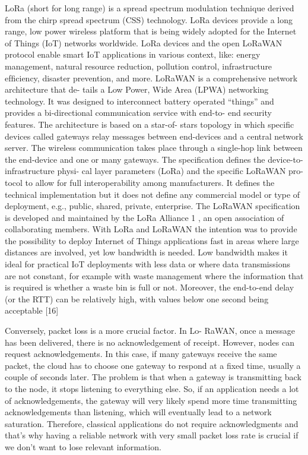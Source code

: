 	LoRa (short for long range) is a spread spectrum modulation
	technique derived from the chirp spread spectrum (CSS)
	technology. LoRa devices provide a long range, low power
	wireless platform that is being widely adopted for the Internet
	of Things (IoT) networks worldwide. LoRa devices and the
	open LoRaWAN protocol enable smart IoT applications in
	various context, like: energy management, natural resource
	reduction, pollution control, infrastructure efﬁciency, disaster
	prevention, and more.
	LoRaWAN is a comprehensive network architecture that de-
	tails a Low Power, Wide Area (LPWA) networking technology.
	It was designed to interconnect battery operated “things” and
	provides a bi-directional communication service with end-to-
	end security features. The architecture is based on a star-of-
	stars topology in which speciﬁc devices called gateways relay
	messages between end-devices and a central network server.
	The wireless communication takes place through a single-hop
	link between the end-device and one or many gateways.
	The speciﬁcation deﬁnes the device-to-infrastructure physi-
	cal layer parameters (LoRa) and the speciﬁc LoRaWAN pro-
	tocol to allow for full interoperability among manufacturers. It
	deﬁnes the technical implementation but it does not deﬁne any
	commercial model or type of deployment, e.g., public, shared,
	private, enterprise. The LoRaWAN speciﬁcation is developed
	and maintained by the LoRa Alliance 1 , an open association
	of collaborating members. With LoRa and LoRaWAN the
	intention was to provide the possibility to deploy Internet of
	Things applications fast in areas where large distances are
	involved, yet low bandwidth is needed. Low bandwidth makes
	it ideal for practical IoT deployments with less data or where
	data transmissions are not constant, for example with waste
	management where the information that is required is whether
	a waste bin is full or not. Moreover, the end-to-end delay (or
	the RTT) can be relatively high, with values below one second
	being acceptable [16]
	
	Conversely, packet loss is a more crucial factor. In Lo-
	RaWAN, once a message has been delivered, there is no
	acknowledgement of receipt. However, nodes can request
	acknowledgements. In this case, if many gateways receive the
	same packet, the cloud has to choose one gateway to respond
	at a ﬁxed time, usually a couple of seconds later. The problem
	is that when a gateway is transmitting back to the node, it stops
	listening to everything else. So, if an application needs a lot of
	acknowledgements, the gateway will very likely spend more
	time transmitting acknowledgements than listening, which will
	eventually lead to a network saturation. Therefore, classical
	applications do not require acknowledgments and that’s why
	having a reliable network with very small packet loss rate is
	crucial if we don’t want to lose relevant information.
	
